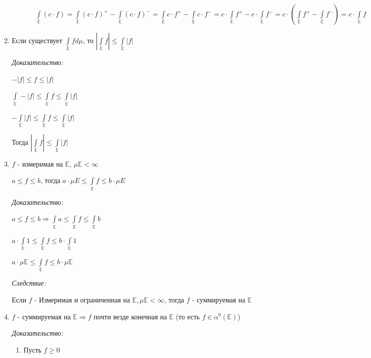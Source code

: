 \documentclass[paper=a4, fontsize=13.2pt]{article}
\begin{document}
\begin{enumerate}
\begin{enumerate}
\begin{enumerate}
			$\int\limits_{\mathds{E}} (c \cdot f) = \int\limits_{\mathds{E}} (c \cdot f)^+ - \int\limits_{\mathds{E}} (c \cdot f)^- = \int\limits_{\mathds{E}} c \cdot f^+ - \int\limits_{\mathds{E}} c \cdot f^- = c \cdot \int\limits_{\mathds{E}} f^+ - c \cdot \int\limits_{\mathds{E}} f^- = c \cdot (\int\limits_{\mathds{E}} f^+ - \int\limits_{\mathds{E}} f^-) = c \cdot \int\limits_{\mathds{E}} f$
		\end{enumerate}
	\end{enumerate}

	\item Если существует $\int\limits_{\mathds{E}} f d\mu$, то $|\int\limits_{\mathds{E}} f| \leqslant \int\limits_{\mathds{E}} |f|$

	\emph{Доказательство:}

	$-|f| \leqslant f \leqslant |f|$

	$\int\limits_{\mathds{E}} -|f| \leqslant \int\limits_{\mathds{E}} f \leqslant \int\limits_{\mathds{E}} |f|$

	$-\int\limits_{\mathds{E}} |f| \leqslant \int\limits_{\mathds{E}} f \leqslant \int\limits_{\mathds{E}} |f|$

	Тогда $|\int\limits_{\mathds{E}} f| \leqslant \int\limits_{\mathds{E}} |f|$


	\item $f$ - измеримая на $\mathds{E}$, $\mu \mathds{E} < \infty$

	$a \leqslant f \leqslant b$, тогда $a \cdot \mu E \leqslant \int\limits_{\mathds{E}} f \leqslant b \cdot \mu E$

	\emph{Доказательство: }

	$a \leqslant f \leqslant b \Rightarrow \int\limits_{\mathds{E}}a \leqslant \int\limits_{\mathds{E}} f \leqslant \int\limits_{\mathds{E}} b$

	$a \cdot \int\limits_{\mathds{E}} 1 \leqslant \int\limits_{\mathds{E}} f \leqslant b \cdot \int\limits_{\mathds{E}} 1$

	$a \cdot \mu \mathds{E} \leqslant \int\limits_{\mathds{E}} f \leqslant b \cdot \mu \mathds{E}$

	\emph{Следствие:}

	Если $f$ - Измеримая и ограниченная на $\mathds{E}, \mu \mathds{E} < \infty$, тогда $f$ - суммируемая на $\mathds{E}$

	\item $f$ - суммируемая на $\mathds{E} \Rightarrow f$ почти везде конечная на $\mathds{E}$ (то есть $f \in \alpha^0(\mathds{E})$)

	\emph{Доказательство:}
	\begin{enumerate}
		\item Пусть $f \geqslant 0$


\end{enumerate}
\end{enumerate}
\end{document}
